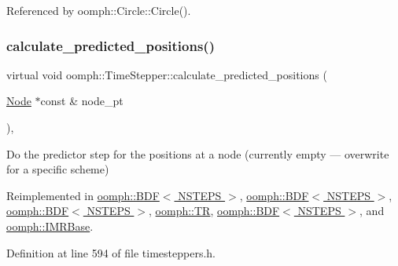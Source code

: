 Referenced by oomph\+::\+Circle\+::\+Circle().

\mbox{\label{classoomph_1_1TimeStepper_a2e7fafceb9330ac971078cf9dc248701}} 
\subsubsection{\texorpdfstring{calculate\+\_\+predicted\+\_\+positions()}{calculate\_predicted\_positions()}}
{\footnotesize\ttfamily virtual void oomph\+::\+Time\+Stepper\+::calculate\+\_\+predicted\+\_\+positions (\begin{DoxyParamCaption}\item[{\hyperlink{classoomph_1_1Node}{Node} $\ast$const \&}]{node\+\_\+pt }\end{DoxyParamCaption})\hspace{0.3cm}{\ttfamily [inline]}, {\ttfamily [virtual]}}



Do the predictor step for the positions at a node (currently empty --- overwrite for a specific scheme) 



Reimplemented in \hyperlink{classoomph_1_1BDF_a24a8bcf4fffc8cd4514ef36fc2c997f8}{oomph\+::\+B\+D\+F$<$ N\+S\+T\+E\+P\+S $>$}, \hyperlink{classoomph_1_1BDF_a86f7aaacfb854380e3f2e6b36c6f0476}{oomph\+::\+B\+D\+F$<$ N\+S\+T\+E\+P\+S $>$}, \hyperlink{classoomph_1_1BDF_a908d5e82020a1083dfb82719efc5c987}{oomph\+::\+B\+D\+F$<$ N\+S\+T\+E\+P\+S $>$}, \hyperlink{classoomph_1_1TR_a5ef44b410f646c0f94eb2f5a2d80bb03}{oomph\+::\+TR}, \hyperlink{classoomph_1_1BDF_a60f640c138a3e63c35888bedc68c4e5d}{oomph\+::\+B\+D\+F$<$ N\+S\+T\+E\+P\+S $>$}, and \hyperlink{classoomph_1_1IMRBase_ac206f72b8054828b715756417dcd230a}{oomph\+::\+I\+M\+R\+Base}.



Definition at line 594 of file timesteppers.\+h.

\mbox{\label{classoomph_1_1TimeStepper_a159d508b1ae643fe31b55da9ee789dbf}} 
